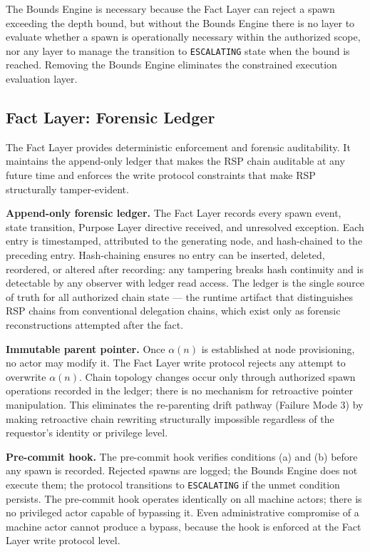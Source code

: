 The Bounds Engine is necessary because the Fact Layer can reject a spawn exceeding the depth bound, but without the Bounds Engine there is no layer to evaluate whether a spawn is operationally necessary within the authorized scope, nor any layer to manage the transition to \texttt{ESCALATING} state when the bound is reached. Removing the Bounds Engine eliminates the constrained execution evaluation layer.

\subsection{Fact Layer: Forensic Ledger}
\label{sec:rs-fact-ledger}

The Fact Layer provides deterministic enforcement and forensic auditability. It maintains the append-only ledger that makes the RSP chain auditable at any future time and enforces the write protocol constraints that make RSP structurally tamper-evident.

\medskip
\noindent\textbf{Append-only forensic ledger.} The Fact Layer records every spawn event, state transition, Purpose Layer directive received, and unresolved exception. Each entry is timestamped, attributed to the generating node, and hash-chained to the preceding entry. Hash-chaining ensures no entry can be inserted, deleted, reordered, or altered after recording: any tampering breaks hash continuity and is detectable by any observer with ledger read access. The ledger is the single source of truth for all authorized chain state — the runtime artifact that distinguishes RSP chains from conventional delegation chains, which exist only as forensic reconstructions attempted after the fact.

\medskip
\noindent\textbf{Immutable parent pointer.} Once $\alpha(n)$ is established at node provisioning, no actor may modify it. The Fact Layer write protocol rejects any attempt to overwrite $\alpha(n)$. Chain topology changes occur only through authorized spawn operations recorded in the ledger; there is no mechanism for retroactive pointer manipulation. This eliminates the re-parenting drift pathway (Failure Mode 3) by making retroactive chain rewriting structurally impossible regardless of the requestor's identity or privilege level.

\medskip
\noindent\textbf{Pre-commit hook.} The pre-commit hook verifies conditions (a) and (b) before any spawn is recorded. Rejected spawns are logged; the Bounds Engine does not execute them; the protocol transitions to \texttt{ESCALATING} if the unmet condition persists. The pre-commit hook operates identically on all machine actors; there is no privileged actor capable of bypassing it. Even administrative compromise of a machine actor cannot produce a bypass, because the hook is enforced at the Fact Layer write protocol level.

